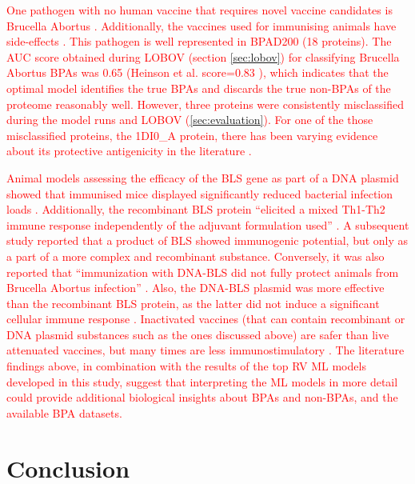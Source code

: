 \documentclass[10pt,journal,compsoc,twoside]{IEEEtran}
\begin{document}
\textcolor{red}{One pathogen with no human vaccine that requires novel vaccine candidates is Brucella Abortus \cite{new-gen-brucella-vaccines}. Additionally, the vaccines used for immunising animals have side-effects \cite{dorneles_2015}. This pathogen is well represented in BPAD200 (18 proteins). The AUC score obtained during LOBOV (section \ref{sec:lobov}) for classifying Brucella Abortus BPAs was 0.65 (Heinson et al. score=0.83 \cite{heinson_2019}), which indicates that the optimal model identifies the true BPAs and discards the true non-BPAs of the proteome reasonably well. However, three proteins were consistently misclassified during the model runs and LOBOV (\ref{sec:evaluation}). For one of the those misclassified proteins, the 1DI0\_A protein, there has been varying evidence about its protective antigenicity in the literature \cite{velikovsky_goldbaum_bowden_2002} \cite{velikovsky_goldbaum_bowden_2003} \cite{laplagne_2004}.}
	
\textcolor{red}{Animal models assessing the efficacy of the BLS gene as part of a DNA plasmid showed that immunised mice displayed significantly reduced bacterial infection loads \cite{velikovsky_goldbaum_bowden_2002}. Additionally, the recombinant BLS protein “elicited a mixed Th1-Th2 immune response independently of the adjuvant formulation used” \cite{velikovsky_goldbaum_bowden_2003}. A subsequent study \cite{laplagne_2004} reported that a product of BLS showed immunogenic potential, but only as a part of a more complex and recombinant substance. Conversely, it was also reported that “immunization with DNA-BLS did not fully protect animals from Brucella Abortus infection” \cite{velikovsky_goldbaum_bowden_2002}. Also, the DNA-BLS plasmid was more effective than the recombinant BLS protein, as the latter did not induce a significant cellular immune response \cite{velikovsky_goldbaum_bowden_2002}. Inactivated vaccines (that can contain recombinant or DNA plasmid substances such as the ones discussed above) are safer than live attenuated vaccines, but many times are less immunostimulatory  \cite{vaccine-immunology_fundamentals}. The literature findings above, in combination with the results of the top RV ML models developed in this study, suggest that interpreting the ML models in more detail could provide additional biological insights about BPAs and non-BPAs, and the available BPA datasets.}
 

\section{Conclusion}
\end{document}
